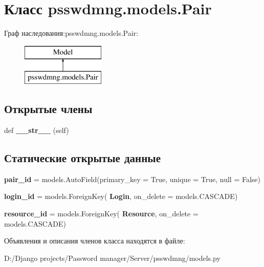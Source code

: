 \section{Класс psswdmng.\+models.\+Pair}
\label{classpsswdmng_1_1models_1_1_pair}
Граф наследования\+:psswdmng.\+models.\+Pair\+:\begin{figure}[H]
\begin{center}
\leavevmode
\includegraphics[height=2.000000cm]{classpsswdmng_1_1models_1_1_pair}
\end{center}
\end{figure}
\subsection*{Открытые члены}
\begin{DoxyCompactItemize}
\item 
\mbox{\label{classpsswdmng_1_1models_1_1_pair_a16ba5f23e54d6cd528613e2c5fb5e66f}} 
def {\bfseries \+\_\+\+\_\+str\+\_\+\+\_\+} (self)
\end{DoxyCompactItemize}
\subsection*{Статические открытые данные}
\begin{DoxyCompactItemize}
\item 
\mbox{\label{classpsswdmng_1_1models_1_1_pair_a5bd28f0bc0c7532708908d78c7917ee6}} 
{\bfseries pair\+\_\+id} = models.\+Auto\+Field(primary\+\_\+key = True, unique = True, null = False)
\item 
\mbox{\label{classpsswdmng_1_1models_1_1_pair_acd7e9411091fc0008404caa88d63e4eb}} 
{\bfseries login\+\_\+id} = models.\+Foreign\+Key(\textquotesingle{}\textbf{ Login}\textquotesingle{}, on\+\_\+delete = models.\+C\+A\+S\+C\+A\+DE)
\item 
\mbox{\label{classpsswdmng_1_1models_1_1_pair_a1f4239cf1377f40695ec907f8e813808}} 
{\bfseries resource\+\_\+id} = models.\+Foreign\+Key(\textquotesingle{}\textbf{ Resource}\textquotesingle{}, on\+\_\+delete = models.\+C\+A\+S\+C\+A\+DE)
\end{DoxyCompactItemize}


Объявления и описания членов класса находятся в файле\+:\begin{DoxyCompactItemize}
\item 
D\+:/\+Django projects/\+Password manager/\+Server/psswdmng/models.\+py\end{DoxyCompactItemize}
